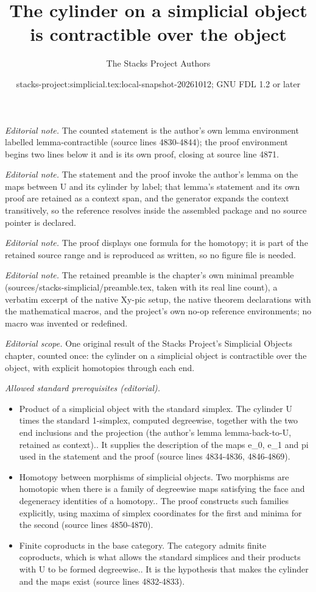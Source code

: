 \documentclass{stacks-project}
\title{The cylinder on a simplicial object is contractible over the object}
\author{The Stacks Project Authors}
\date{stacks-project:simplicial.tex:local-snapshot-20261012; GNU FDL 1.2 or later}
\theoremstyle{plain}
\theoremstyle{definition}
\theoremstyle{remark}
\numberwithin{equation}{subsection}
\begin{document}
\maketitle
\noindent\textit{Editorial note.} The counted statement is the author's own lemma environment labelled lemma-contractible (source lines 4830-4844); the proof environment begins two lines below it and is its own proof, closing at source line 4871.\par\medskip
\noindent\textit{Editorial note.} The statement and the proof invoke the author's lemma on the maps between U and its cylinder by label; that lemma's statement and its own proof are retained as a context span, and the generator expands the context transitively, so the reference resolves inside the assembled package and no source pointer is declared.\par\medskip
\noindent\textit{Editorial note.} The proof displays one formula for the homotopy; it is part of the retained source range and is reproduced as written, so no figure file is needed.\par\medskip
\noindent\textit{Editorial note.} The retained preamble is the chapter's own minimal preamble (sources/stacks-simplicial/preamble.tex, taken with its real line count), a verbatim excerpt of the native Xy-pic setup, the native theorem declarations with the mathematical macros, and the project's own no-op reference environments; no macro was invented or redefined.\par\medskip
\noindent\textit{Editorial scope.} One original result of the Stacks Project's Simplicial Objects chapter, counted once: the cylinder on a simplicial object is contractible over the object, with explicit homotopies through each end.\par\medskip
\noindent\textit{Allowed standard prerequisites (editorial).}\begin{itemize}
\item Product of a simplicial object with the standard simplex. The cylinder U times the standard 1-simplex, computed degreewise, together with the two end inclusions and the projection (the author's lemma lemma-back-to-U, retained as context).. It supplies the description of the maps e\_0, e\_1 and pi used in the statement and the proof (source lines 4834-4836, 4846-4869).
\item Homotopy between morphisms of simplicial objects. Two morphisms are homotopic when there is a family of degreewise maps satisfying the face and degeneracy identities of a homotopy.. The proof constructs such families explicitly, using maxima of simplex coordinates for the first and minima for the second (source lines 4850-4870).
\item Finite coproducts in the base category. The category admits finite coproducts, which is what allows the standard simplices and their products with U to be formed degreewise.. It is the hypothesis that makes the cylinder and the maps exist (source lines 4832-4833).
\end{itemize}\medskip
\end{document}

